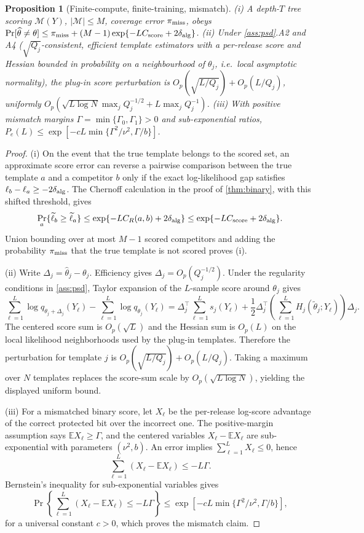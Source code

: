 \documentclass[11pt]{article}
\newtheorem{proposition}{Proposition}
\newcommand{\E}{\mathbb{E}}
\newcommand{\calM}{\mathcal M}
\begin{document}
\begin{proposition}[Finite-compute, finite-training, mismatch]
\label{prop:bounds}
(i) A depth-\(T\) tree scoring \(\calM(Y)\), \(|\calM|\le M\), coverage error \(\pi_{\rm miss}\), obeys \(\Pr[\widehat\theta\ne\theta]\le\pi_{\rm miss}+(M-1)\exp\{-LC_{\rm score}+2\delta_{\rm alg}\}\). (ii) Under \cref{ass:psd}.A2 and A4 (\(\sqrt{Q_j}\)-consistent, efficient template estimators with a per-release score and Hessian bounded in probability on a neighbourhood of \(\theta_j\), i.e.\ local asymptotic normality), the plug-in score perturbation is \(O_p(\sqrt{L/Q_j})+O_p(L/Q_j)\), uniformly \(O_p(\sqrt{L\log N}\max_jQ_j^{-1/2}+L\max_jQ_j^{-1})\). (iii) With positive mismatch margins \(\Gamma=\min\{\Gamma_0,\Gamma_1\}>0\) and sub-exponential ratios, \(P_e(L)\le\exp[-cL\min\{\Gamma^2/\nu^2,\Gamma/b\}]\).
\end{proposition}

\begin{proof}
(i) On the event that the true template belongs to the scored set, an approximate score error can reverse a pairwise comparison between the true template \(a\) and a competitor \(b\) only if the exact log-likelihood gap satisfies \(\ell_b-\ell_a\ge-2\delta_{\rm alg}\). The Chernoff calculation in the proof of \cref{thm:binary}, with this shifted threshold, gives
\[
\Pr_a\{\widetilde\ell_b\ge\widetilde\ell_a\}
\le \exp\{-LC_R(a,b)+2\delta_{\rm alg}\}
\le \exp\{-LC_{\rm score}+2\delta_{\rm alg}\}.
\]
Union bounding over at most \(M-1\) scored competitors and adding the probability \(\pi_{\rm miss}\) that the true template is not scored proves (i).

(ii) Write \(\Delta_j=\widehat\theta_j-\theta_j\). Efficiency gives \(\Delta_j=O_p(Q_j^{-1/2})\). Under the regularity conditions in \cref{ass:psd}, Taylor expansion of the \(L\)-sample score around \(\theta_j\) gives
\[
\sum_{\ell=1}^L\log q_{\theta_j+\Delta_j}(Y_\ell)
-\sum_{\ell=1}^L\log q_{\theta_j}(Y_\ell)
=
\Delta_j^\top\sum_{\ell=1}^Ls_j(Y_\ell)
+\frac12\Delta_j^\top\!\left(\sum_{\ell=1}^LH_j(\widetilde\theta_j;Y_\ell)\right)\!\Delta_j .
\]
The centered score sum is \(O_p(\sqrt L)\) and the Hessian sum is \(O_p(L)\) on the local likelihood neighborhoods used by the plug-in templates. Therefore the perturbation for template \(j\) is \(O_p(\sqrt{L/Q_j})+O_p(L/Q_j)\). Taking a maximum over \(N\) templates replaces the score-sum scale by \(O_p(\sqrt{L\log N})\), yielding the displayed uniform bound.

(iii) For a mismatched binary score, let \(X_\ell\) be the per-release log-score advantage of the correct protected bit over the incorrect one. The positive-margin assumption says \(\E X_\ell\ge\Gamma\), and the centered variables \(X_\ell-\E X_\ell\) are sub-exponential with parameters \((\nu^2,b)\). An error implies \(\sum_{\ell=1}^LX_\ell\le0\), hence
\[
\sum_{\ell=1}^L(X_\ell-\E X_\ell)\le-L\Gamma .
\]
Bernstein's inequality for sub-exponential variables gives
\[
\Pr\!\left\{\sum_{\ell=1}^L(X_\ell-\E X_\ell)\le-L\Gamma\right\}
\le \exp[-cL\min\{\Gamma^2/\nu^2,\Gamma/b\}],
\]
for a universal constant \(c>0\), which proves the mismatch claim.
\end{proof}
\end{document}
